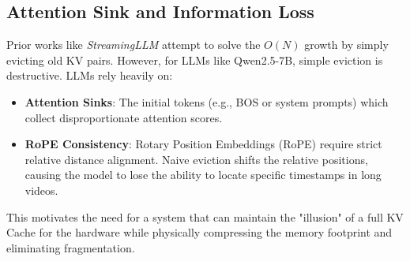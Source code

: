 \subsection{Attention Sink and Information Loss}
Prior works like \textit{StreamingLLM} attempt to solve the $O(N)$ growth by simply evicting old KV pairs. However, for LLMs like Qwen2.5-7B, simple eviction is destructive. LLMs rely heavily on:
\begin{itemize}
    \item \textbf{Attention Sinks}: The initial tokens (e.g., BOS or system prompts) which collect disproportionate attention scores.
    \item \textbf{RoPE Consistency}: Rotary Position Embeddings (RoPE) require strict relative distance alignment. Naive eviction shifts the relative positions, causing the model to lose the ability to locate specific timestamps in long videos.
\end{itemize}

This motivates the need for a system that can maintain the "illusion" of a full KV Cache for the hardware while physically compressing the memory footprint and eliminating fragmentation.